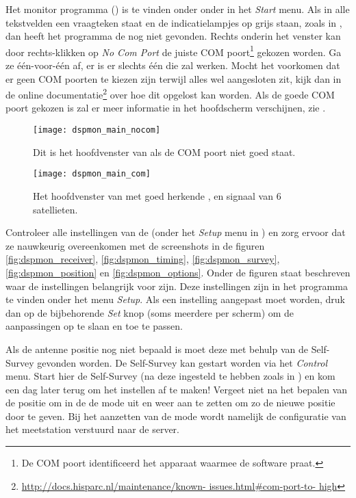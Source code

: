 Het \gps monitor programma (\dspmon) is te vinden onder onder \hisparc
in het \emph{Start} menu. Als in alle tekstvelden een vraagteken staat en de
indicatielampjes op grijs staan, zoals in
, dan heeft het programma de \gps nog niet
gevonden. Rechts onderin het venster kan door rechts-klikken op \emph{No
Com Port} de juiste COM poort\footnote{De COM poort identificeerd het
apparaat waarmee de software praat.} gekozen worden. Ga ze één-voor-één
af, er is er slechts één die zal werken. Mocht het voorkomen dat er geen
COM poorten te kiezen zijn terwijl alles wel aangesloten zit, kijk dan
in de online
documentatie\footnote{\url{http://docs.hisparc.nl/maintenance/known-
issues.html#com-port-to- high}} over hoe dit opgelost kan worden. Als de
goede COM poort gekozen is zal er meer informatie in het hoofdscherm
verschijnen, zie .

\begin{figure}
    \centering
    \texttt{[image: dspmon\_main\_nocom]}
    \caption{Dit is het hoofdvenster van \dspmon als de COM poort niet
    goed staat.}
    \label{fig:dspmon_main_nocom}
\end{figure}

\begin{figure}
    \centering
    \texttt{[image: dspmon\_main\_com]}
    \caption{Het hoofdvenster van \dspmon met goed herkende \gps, en
             signaal van 6 satellieten.}
    \label{fig:dspmon_main_com}
\end{figure}

Controleer alle instellingen van de \gps (onder het \emph{Setup} menu in
\dspmon) en zorg ervoor dat ze nauwkeurig overeenkomen met de
screenshots in de figuren \ref{fig:dspmon_receiver},
\ref{fig:dspmon_timing}, \ref{fig:dspmon_survey},
\ref{fig:dspmon_position} en \ref{fig:dspmon_options}. Onder de figuren
staat beschreven waar de instellingen belangrijk voor zijn. Deze
instellingen zijn in het programma te vinden onder het menu
\emph{Setup}. Als een instelling aangepast moet worden, druk dan op de
bijbehorende \emph{Set} knop (soms meerdere per scherm) om de
aanpassingen op te slaan en toe te passen.

Als de \gps antenne positie nog niet bepaald is moet deze met behulp van
de Self-Survey gevonden worden. De Self-Survey kan gestart worden via
het \emph{Control} menu. Start hier de Self-Survey (na deze ingesteld te hebben
zoals in ) en kom een dag later terug om het
instellen af te maken! Vergeet niet na het bepalen van de positie om in
de \hisparc \daq de \daq mode uit en weer aan te zetten om zo de nieuwe
positie door te geven. Bij het aanzetten van de \daq mode wordt namelijk
de configuratie van het meetstation verstuurd naar de server.

